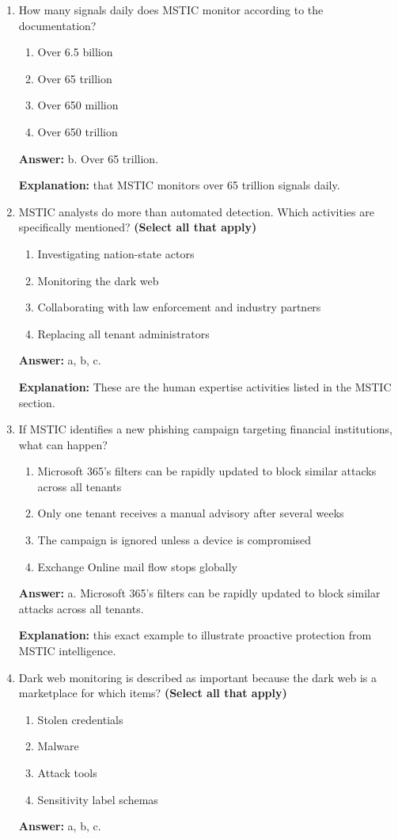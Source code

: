 \documentclass[10pt]{article}
\begin{document}
\begin{enumerate}[leftmargin=*]
\item How many signals daily does MSTIC monitor according to the documentation?
\begin{enumerate}[label=\alph*., leftmargin=1.5em]
\item Over 6.5 billion
\item Over 65 trillion
\item Over 650 million
\item Over 650 trillion
\end{enumerate}
\textbf{Answer:} b. Over 65 trillion.

\textbf{Explanation:} that MSTIC monitors over 65 trillion signals daily.

\item MSTIC analysts do more than automated detection. Which activities are specifically mentioned? \textbf{(Select all that apply)}
\begin{enumerate}[label=\alph*., leftmargin=1.5em]
\item Investigating nation-state actors
\item Monitoring the dark web
\item Collaborating with law enforcement and industry partners
\item Replacing all tenant administrators
\end{enumerate}
\textbf{Answer:} a, b, c.

\textbf{Explanation:} These are the human expertise activities listed in the MSTIC section.

\item If MSTIC identifies a new phishing campaign targeting financial institutions, what can happen?
\begin{enumerate}[label=\alph*., leftmargin=1.5em]
\item Microsoft 365’s filters can be rapidly updated to block similar attacks across all tenants
\item Only one tenant receives a manual advisory after several weeks
\item The campaign is ignored unless a device is compromised
\item Exchange Online mail flow stops globally
\end{enumerate}
\textbf{Answer:} a. Microsoft 365’s filters can be rapidly updated to block similar attacks across all tenants.

\textbf{Explanation:} this exact example to illustrate proactive protection from MSTIC intelligence.

\item Dark web monitoring is described as important because the dark web is a marketplace for which items? \textbf{(Select all that apply)}
\begin{enumerate}[label=\alph*., leftmargin=1.5em]
\item Stolen credentials
\item Malware
\item Attack tools
\item Sensitivity label schemas
\end{enumerate}
\textbf{Answer:} a, b, c.


\end{enumerate}
\end{document}
